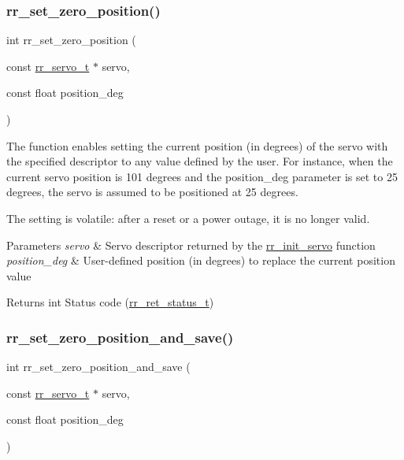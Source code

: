 \subsubsection{\texorpdfstring{rr\+\_\+set\+\_\+zero\+\_\+position()}{rr\_set\_zero\_position()}}
{\footnotesize\ttfamily int rr\+\_\+set\+\_\+zero\+\_\+position (\begin{DoxyParamCaption}\item[{const \hyperlink{structrr__servo__t}{rr\+\_\+servo\+\_\+t} $\ast$}]{servo,  }\item[{const float}]{position\+\_\+deg }\end{DoxyParamCaption})}



The function enables setting the current position (in degrees) of the servo with the specified descriptor to any value defined by the user. For instance, when the current servo position is 101 degrees and the \textquotesingle{}position\+\_\+deg\textquotesingle{} parameter is set to 25 degrees, the servo is assumed to be positioned at 25 degrees. 

The setting is volatile\+: after a reset or a power outage, it is no longer valid.


\begin{DoxyParams}{Parameters}
{\em servo} & Servo descriptor returned by the \hyperlink{group___init_ga0adb313a3eeb8a4399431e940a1f3e9e}{rr\+\_\+init\+\_\+servo} function \\
\hline
{\em position\+\_\+deg} & User-\/defined position (in degrees) to replace the current position value \\
\hline
\end{DoxyParams}
\begin{DoxyReturn}{Returns}
int Status code (\hyperlink{api_8h_a92d5be5038abcf89837faf85a08debdc}{rr\+\_\+ret\+\_\+status\+\_\+t}) 
\end{DoxyReturn}
\mbox{\label{group___config_ga7ccc75e00e431b8a57150a71791488c3}} 
\subsubsection{\texorpdfstring{rr\+\_\+set\+\_\+zero\+\_\+position\+\_\+and\+\_\+save()}{rr\_set\_zero\_position\_and\_save()}}
{\footnotesize\ttfamily int rr\+\_\+set\+\_\+zero\+\_\+position\+\_\+and\+\_\+save (\begin{DoxyParamCaption}\item[{const \hyperlink{structrr__servo__t}{rr\+\_\+servo\+\_\+t} $\ast$}]{servo,  }\item[{const float}]{position\+\_\+deg }\end{DoxyParamCaption})}




